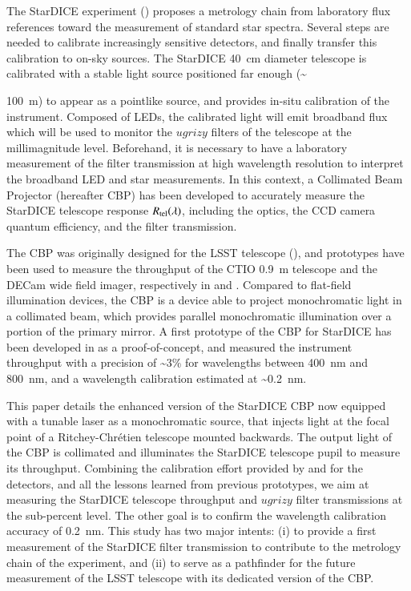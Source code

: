 The StarDICE experiment (\citealt{Betoule_2023}) proposes a metrology chain from laboratory flux references toward the measurement of standard star spectra. Several steps are needed to calibrate increasingly sensitive detectors, and finally transfer this calibration to on-sky sources. The StarDICE \SI{40}{\centi\meter} diameter telescope is calibrated with a stable light source positioned far enough (\textasciitilde {\SI{100}{\meter}) to appear as a pointlike source, and provides in-situ calibration of the instrument. Composed of LEDs, the calibrated light will emit broadband flux which will be used to monitor the $ugrizy$ filters of the \SD{} telescope at the millimagnitude level. Beforehand, it is necessary to have a laboratory measurement of the filter transmission at high wavelength resolution to interpret the broadband LED and star measurements. In this context, a Collimated Beam Projector (hereafter CBP) has been developed to accurately measure the StarDICE telescope response $R_{\mathrm{tel}}(\lambda)$, including the optics, the CCD camera quantum efficiency, and the filter transmission. 

The CBP was originally designed for the LSST telescope (\citealt{ingraham2016}), and prototypes have been used to measure the throughput of the CTIO \SI{0.9}{\meter} telescope and the DECam wide field imager, respectively in \cite{coughlin2018} and \cite{coughlin2016}. Compared to flat-field illumination devices, the CBP is a device able to project monochromatic light in a collimated beam, which provides parallel monochromatic illumination over a portion of the primary mirror. A first prototype of the CBP for StarDICE has been developed in \cite{Mondrik_2023} as a proof-of-concept, and measured the instrument throughput with a precision of \textasciitilde 3\% for wavelengths between \SI{400}{\nano\meter} and \SI{800}{\nano\meter}, and a wavelength calibration estimated at \textasciitilde \SI{0.2}{\nano\meter}. 

This paper details the enhanced version of the StarDICE CBP now equipped with a tunable laser as a monochromatic source, that injects light at the focal point of a Ritchey-Chrétien telescope mounted backwards. The output light of the CBP is collimated and illuminates the StarDICE telescope pupil to measure its throughput. Combining the calibration effort provided by \cite{houston2008detectors} and \cite{solarcell} for the detectors, and all the lessons learned from previous prototypes, we aim at measuring the StarDICE telescope throughput and $ugrizy$ filter transmissions at the sub-percent level. The other goal is to confirm the wavelength calibration accuracy of \SI{0.2}{\nano\meter}. This study has two major intents: (i) to provide a first measurement of the StarDICE filter transmission to contribute to the metrology chain of the experiment, and (ii) to serve as a pathfinder for the future measurement of the LSST telescope with its dedicated version of the CBP.

}
